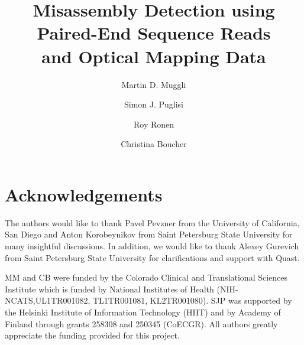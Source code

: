 \documentclass[letterpaper,11pt]{llncs}
\begin{document}
\title{Misassembly Detection using Paired-End Sequence Reads \\ and Optical Mapping Data}
\author{
Martin D. Muggli
\and
Simon J. Puglisi
\and
Roy Ronen
\and
Christina Boucher
}



\maketitle







\section*{Acknowledgements} 
The authors would like to thank Pavel Pevzner from the University of California, San Diego and Anton Korobeynikov from Saint Petersburg State University for many insightful discussions.  In addition, we would like to thank Alexey Gurevich from Saint Petersburg State University for clarifications and support with Quast.  

MM and CB were funded by the Colorado Clinical and Translational Sciences Institute which is funded by National Institutes of Health (NIH-NCATS,UL1TR001082, TL1TR001081, KL2TR001080).  SJP was supported by the Helsinki Institute of Information Technology (HIIT) and by Academy of Finland through grants 258308 and 250345 (CoECGR).  All authors greatly appreciate the funding provided for this project.  



\newpage

\end{document}

